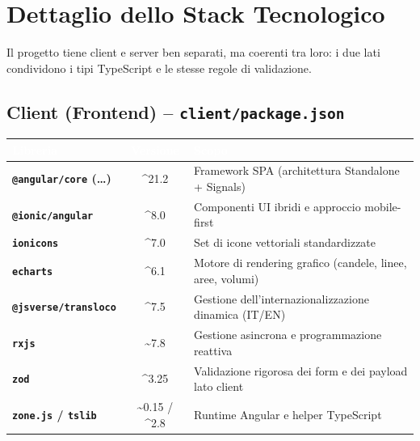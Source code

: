 \section{Dettaglio dello Stack Tecnologico}

Il progetto tiene client e server ben separati, ma coerenti tra loro: i due lati condividono i tipi TypeScript e le stesse regole di validazione.

\subsection{Client (Frontend) -- \texttt{client/package.json}}
\begin{table}[H]
\centering
{}
\renewcommand{\arraystretch}{1.3}
\begin{tabularx}{\textwidth}{|l|c|X|}
\hline
\rowcolor[HTML]{3B3766}
\textcolor{white}{\textbf{Libreria}} & \textcolor{white}{\textbf{Versione}} & \textcolor{white}{\textbf{Scopo}} \\ \hline
\textbf{\texttt{@angular/core} (\dots)} & \textasciicircum{}21.2 & Framework SPA (architettura Standalone + Signals) \\ \hline
\textbf{\texttt{@ionic/angular}} & \textasciicircum{}8.0 & Componenti UI ibridi e approccio mobile-first \\ \hline
\textbf{\texttt{ionicons}} & \textasciicircum{}7.0 & Set di icone vettoriali standardizzate \\ \hline
\textbf{\texttt{echarts}} & \textasciicircum{}6.1 & Motore di rendering grafico (candele, linee, aree, volumi) \\ \hline
\textbf{\texttt{@jsverse/transloco}} & \textasciicircum{}7.5 & Gestione dell'internazionalizzazione dinamica (IT/EN) \\ \hline
\textbf{\texttt{rxjs}} & \textasciitilde{}7.8 & Gestione asincrona e programmazione reattiva \\ \hline
\textbf{\texttt{zod}} & \textasciicircum{}3.25 & Validazione rigorosa dei form e dei payload lato client \\ \hline
\textbf{\texttt{zone.js} / \texttt{tslib}} & \textasciitilde{}0.15 / \textasciicircum{}2.8 & Runtime Angular e helper TypeScript \\ \hline
\end{tabularx}
\end{table}

